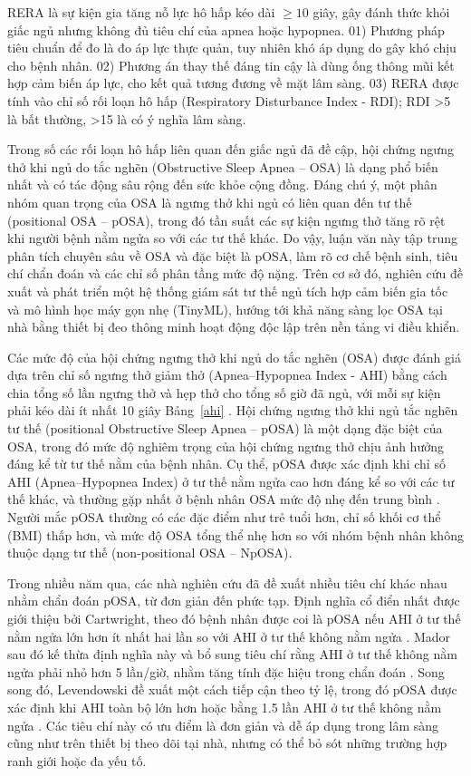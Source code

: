 RERA là sự kiện gia tăng nỗ lực hô hấp kéo dài $\geq 10$ giây, gây đánh thức
khỏi giấc ngủ nhưng không đủ tiêu chí của apnea hoặc hypopnea. 01) Phương pháp
tiêu chuẩn để đo là đo áp lực thực quản, tuy nhiên khó áp dụng do gây khó chịu
cho bệnh nhân. 02) Phương án thay thế đáng tin cậy là dùng ống thông mũi kết
hợp cảm biến áp lực, cho kết quả tương đương về mặt lâm sàng. 03) RERA được
tính vào chỉ số rối loạn hô hấp (Respiratory Disturbance Index - RDI); RDI >5
là bất thường, >15 là có ý nghĩa lâm sàng.

Trong số các rối loạn hô hấp liên quan đến giấc ngủ đã đề cập, hội chứng ngưng
thở khi ngủ do tắc nghẽn (Obstructive Sleep Apnea – OSA) là dạng phổ biến nhất
và có tác động sâu rộng đến sức khỏe cộng đồng. Đáng chú ý, một phân nhóm quan
trọng của OSA là ngưng thở khi ngủ có liên quan đến tư thế (positional OSA –
pOSA), trong đó tần suất các sự kiện ngưng thở tăng rõ rệt khi người bệnh nằm
ngửa so với các tư thế khác. Do vậy, luận văn này tập trung phân tích chuyên
sâu về OSA và đặc biệt là pOSA, làm rõ cơ chế bệnh sinh, tiêu chí chẩn đoán và
các chỉ số phân tầng mức độ nặng. Trên cơ sở đó, nghiên cứu đề xuất và phát
triển một hệ thống giám sát tư thế ngủ tích hợp cảm biến gia tốc và mô hình học
máy gọn nhẹ (TinyML), hướng tới khả năng sàng lọc OSA tại nhà bằng thiết bị đeo
thông minh hoạt động độc lập trên nền tảng vi điều khiển.

Các mức độ của hội chứng ngưng thở khi ngủ do tắc nghẽn (OSA) được đánh giá dựa
trên chỉ số ngưng thở giảm thở (Apnea–Hypopnea Index - AHI) bằng cách chia tổng
số lần ngưng thở và hẹp thở cho tổng số giờ đã ngủ, với mỗi sự kiện phải kéo
dài ít nhất 10 giây Bảng~\ref{ahi} \cite{osa_summary}. Hội chứng ngưng thở khi
ngủ tắc nghẽn tư thế (positional Obstructive Sleep Apnea – pOSA) là một dạng
đặc biệt của OSA, trong đó mức độ nghiêm trọng của hội chứng ngưng thở chịu ảnh
hưởng đáng kể từ tư thế nằm của bệnh nhân. Cụ thể, pOSA được xác định khi chỉ
số AHI (Apnea–Hypopnea Index) ở tư thế nằm ngửa cao hơn đáng kể so với các tư
thế khác, và thường gặp nhất ở bệnh nhân OSA mức độ nhẹ đến trung bình
\cite{heinzer2018,aloweidat2023positional}. Người mắc pOSA thường có các đặc
điểm như trẻ tuổi hơn, chỉ số khối cơ thể (BMI) thấp hơn, và mức độ OSA tổng
thể nhẹ hơn so với nhóm bệnh nhân không thuộc dạng tư thế (non-positional OSA –
NpOSA).

Trong nhiều năm qua, các nhà nghiên cứu đã đề xuất nhiều tiêu chí khác nhau
nhằm chẩn đoán pOSA, từ đơn giản đến phức tạp. Định nghĩa cổ điển nhất được
giới thiệu bởi Cartwright, theo đó bệnh nhân được coi là pOSA nếu AHI ở tư thế
nằm ngửa lớn hơn ít nhất hai lần so với AHI ở tư thế không nằm ngửa
\cite{cartwright1984position}. Mador sau đó kế thừa định nghĩa này và bổ sung
tiêu chí rằng AHI ở tư thế không nằm ngửa phải nhỏ hơn 5 lần/giờ, nhằm tăng
tính đặc hiệu trong chẩn đoán \cite{mador2005prevalence}. Song song đó,
Levendowski đề xuất một cách tiếp cận theo tỷ lệ, trong đó pOSA được xác định
khi AHI toàn bộ lớn hơn hoặc bằng 1.5 lần AHI ở tư thế không nằm ngửa
\cite{levendowski2015neck}. Các tiêu chí này có ưu điểm là đơn giản và dễ áp
dụng trong lâm sàng cũng như trên thiết bị theo dõi tại nhà, nhưng có thể bỏ
sót những trường hợp ranh giới hoặc đa yếu tố.

